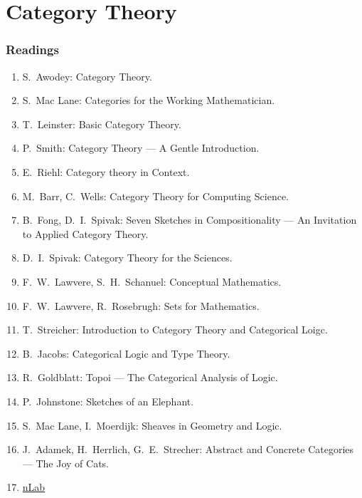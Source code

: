 \documentclass[UTF8,11pt,colorlinks,compress,openany]{beamer}%
\begin{document}
\section{Category Theory}


\begin{frame}\frametitle{Readings}
\begin{enumerate}\small
	\item S.~Awodey: Category Theory.
	\item S.~Mac Lane: Categories for the Working Mathematician.
	\item T.~Leinster: Basic Category Theory.
	\item P.~Smith: Category Theory --- A Gentle Introduction.
	\item E.~Riehl: Category theory in Context.
	\item M.~Barr, C.~Wells: Category Theory for Computing Science.
	\item B.~Fong, D.~I.~Spivak: Seven Sketches in Compositionality --- An Invitation to Applied Category Theory.
	\item D.~I.~Spivak: Category Theory for the Sciences.
	\item F.~W.~Lawvere, S.~H.~Schanuel: Conceptual Mathematics.
	\item F.~W.~Lawvere, R.~Rosebrugh: Sets for Mathematics.
	\item T.~Streicher: Introduction to Category Theory and Categorical Loigc.
	\item B.~Jacobs: Categorical Logic and Type Theory.
	\item R.~Goldblatt: Topoi --- The Categorical Analysis of Logic.
	\item P.~Johnstone: Sketches of an Elephant.
	\item S.~Mac Lane, I.~Moerdijk: Sheaves in Geometry and Logic.
	\item J.~Adamek, H.~Herrlich, G.~E.~Strecher: Abstract and Concrete Categories --- The Joy of Cats.
	\item \href{https://ncatlab.org/}{nLab}
\end{enumerate}
\end{frame}
\end{document}

